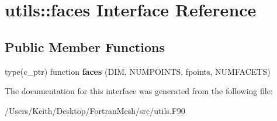 \hypertarget{interfaceutils_1_1faces}{}\section{utils\+:\+:faces Interface Reference}
\label{interfaceutils_1_1faces}
\subsection*{Public Member Functions}
\begin{DoxyCompactItemize}
\item 
type(c\+\_\+ptr) function {\bfseries faces} (D\+IM, N\+U\+M\+P\+O\+I\+N\+TS, fpoints, N\+U\+M\+F\+A\+C\+E\+TS)\hypertarget{interfaceutils_1_1faces_afe190dc92f4c01976440a829101891a9}{}\label{interfaceutils_1_1faces_afe190dc92f4c01976440a829101891a9}

\end{DoxyCompactItemize}


The documentation for this interface was generated from the following file\+:\begin{DoxyCompactItemize}
\item 
/\+Users/\+Keith/\+Desktop/\+Fortran\+Mesh/src/utils.\+F90\end{DoxyCompactItemize}
